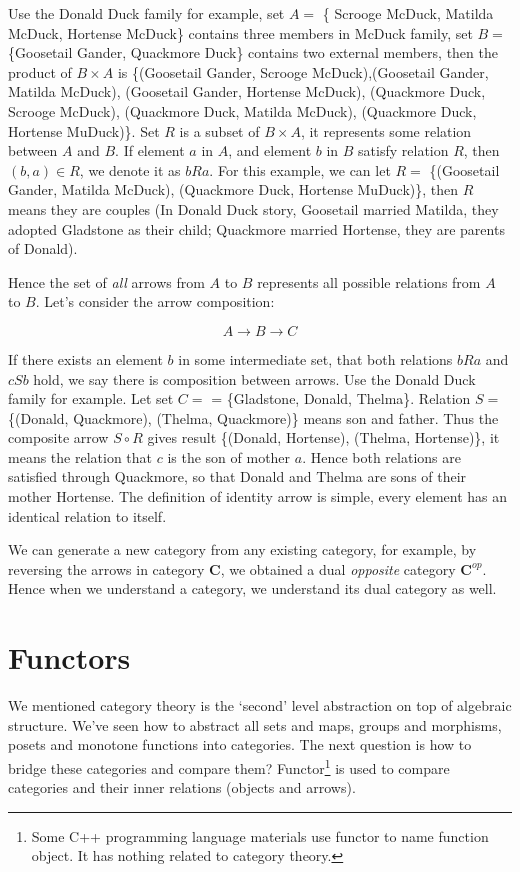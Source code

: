 \documentclass[b5paper]{article}
\begin{document}
Use the Donald Duck family for example, set $A =$ \{ Scrooge McDuck, Matilda McDuck, Hortense McDuck\} contains three members in McDuck family, set $B = $ \{Goosetail Gander, Quackmore Duck\} contains two external members, then the product of $B \times A$ is \{(Goosetail Gander, Scrooge McDuck),(Goosetail Gander, Matilda McDuck), (Goosetail Gander, Hortense McDuck), (Quackmore Duck, Scrooge McDuck), (Quackmore Duck, Matilda McDuck), (Quackmore Duck, Hortense MuDuck)\}. Set $R$ is a subset of $B \times A$, it represents some relation between $A$ and $B$. If element $a$ in $A$, and element $b$ in $B$ satisfy relation $R$, then $(b, a) \in R$, we denote it as $bRa$. For this example, we can let $R=$ \{(Goosetail Gander, Matilda McDuck), (Quackmore Duck, Hortense MuDuck)\}, then $R$ means they are couples (In Donald Duck story, Goosetail married Matilda, they adopted Gladstone as their child; Quackmore married Hortense, they are parents of Donald).

Hence the set of {\em all} arrows from $A$ to $B$ represents all possible relations from $A$ to $B$. Let's consider the arrow composition:

\[
A \to B \to C
\]

If there exists an element $b$ in some intermediate set, that both relations $bRa$ and $cSb$ hold, we say there is composition between arrows. Use the Donald Duck family for example. Let set $C=$ = \{Gladstone, Donald, Thelma\}. Relation $S=$ \{(Donald, Quackmore), (Thelma, Quackmore)\} means son and father. Thus the composite arrow $S \circ R$ gives result \{(Donald, Hortense), (Thelma, Hortense)\}, it means the relation that $c$ is the son of mother $a$. Hence both relations are satisfied through Quackmore, so that Donald and Thelma are sons of their mother Hortense. The definition of identity arrow is simple, every element has an identical relation to itself.

We can generate a new category from any existing category, for example, by reversing the arrows in category $\pmb{C}$, we obtained a dual {\em opposite} category $\pmb{C}^{op}$. Hence when we understand a category, we understand its dual category as well.

\section{Functors}

We mentioned category theory is the `second' level abstraction on top of algebraic structure. We've seen how to abstract all sets and maps, groups and morphisms, posets and monotone functions into categories. The next question is how to bridge these categories and compare them? Functor\footnote{Some C++ programming language materials use functor to name function object. It has nothing related to category theory.} is used to compare categories and their inner relations (objects and arrows).
\end{document}
